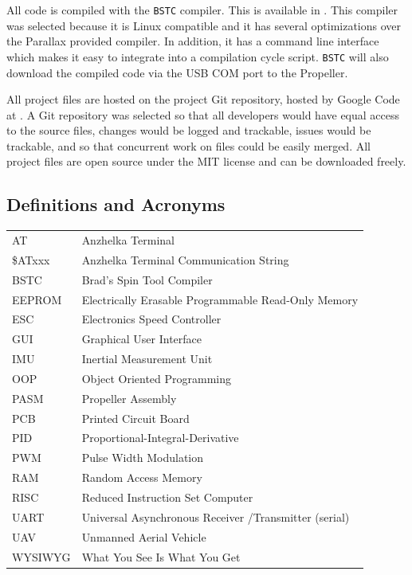 \documentclass{article}
\numberwithin{equation}{section} %
\begin{document}

All code is compiled with the \texttt{BSTC} compiler. This is available in \cite{campbell09}. This compiler was selected because it is Linux compatible and it has several optimizations over the Parallax provided compiler. In addition, it has a command line interface which makes it easy to integrate into a compilation cycle script. \texttt{BSTC} will also download the compiled code via the USB COM port to the Propeller.

All project files are hosted on the project Git repository, hosted by Google Code at \cite{anzhelka_code}. A Git repository was selected so that all developers would have equal access to the source files, changes would be logged and trackable, issues would be trackable, and so that concurrent work on files  could be easily merged. All project files are open source under the MIT license and can be downloaded freely.

\subsection{Definitions and Acronyms}
\begin{tabular}{l l}
	AT & Anzhelka Terminal \\
	\$ATxxx & Anzhelka Terminal Communication String \\
	BSTC & Brad's Spin Tool Compiler \\
	EEPROM & Electrically Erasable Programmable Read-Only Memory \\
	ESC & Electronics Speed Controller \\
	GUI & Graphical User Interface \\
	IMU & Inertial Measurement Unit \\
	OOP & Object Oriented Programming \\
	PASM & Propeller Assembly \\
	PCB & Printed Circuit Board \\
	PID & Proportional-Integral-Derivative \\
	PWM & Pulse Width Modulation \\
	RAM & Random Access Memory \\
	RISC & Reduced Instruction Set Computer\\
	UART & Universal Asynchronous Receiver /Transmitter (serial) \\
	UAV & Unmanned Aerial Vehicle \\
	WYSIWYG & What You See Is What You Get \\
\end{tabular}
\end{document}
